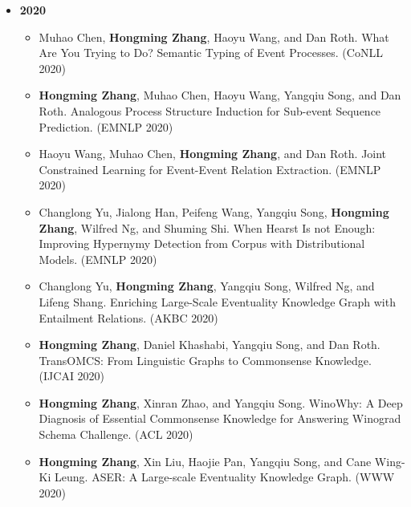 \begin{itemize}[leftmargin=*, itemsep=0.35em, topsep=0.2em]
  \item[] \textbf{2020}
  \begin{itemize}[leftmargin=1.5em, itemsep=0.2em, topsep=0.1em]
    \item Muhao Chen, \textbf{Hongming Zhang}, Haoyu Wang, and Dan Roth. What Are You Trying to Do? Semantic Typing of Event Processes. (CoNLL 2020)
    \item \textbf{Hongming Zhang}, Muhao Chen, Haoyu Wang, Yangqiu Song, and Dan Roth. Analogous Process Structure Induction for Sub-event Sequence Prediction. (EMNLP 2020)
    \item Haoyu Wang, Muhao Chen, \textbf{Hongming Zhang}, and Dan Roth. Joint Constrained Learning for Event-Event Relation Extraction. (EMNLP 2020)
    \item Changlong Yu, Jialong Han, Peifeng Wang, Yangqiu Song, \textbf{Hongming Zhang}, Wilfred Ng, and Shuming Shi. When Hearst Is not Enough: Improving Hypernymy Detection from Corpus with Distributional Models. (EMNLP 2020)
    \item Changlong Yu, \textbf{Hongming Zhang}, Yangqiu Song, Wilfred Ng, and Lifeng Shang. Enriching Large-Scale Eventuality Knowledge Graph with Entailment Relations. (AKBC 2020)
    \item \textbf{Hongming Zhang}, Daniel Khashabi, Yangqiu Song, and Dan Roth. TransOMCS: From Linguistic Graphs to Commonsense Knowledge. (IJCAI 2020)
    \item \textbf{Hongming Zhang}, Xinran Zhao, and Yangqiu Song. WinoWhy: A Deep Diagnosis of Essential Commonsense Knowledge for Answering Winograd Schema Challenge. (ACL 2020)
    \item \textbf{Hongming Zhang}, Xin Liu, Haojie Pan, Yangqiu Song, and Cane Wing-Ki Leung. ASER: A Large-scale Eventuality Knowledge Graph. (WWW 2020)
  \end{itemize}


\end{itemize}
